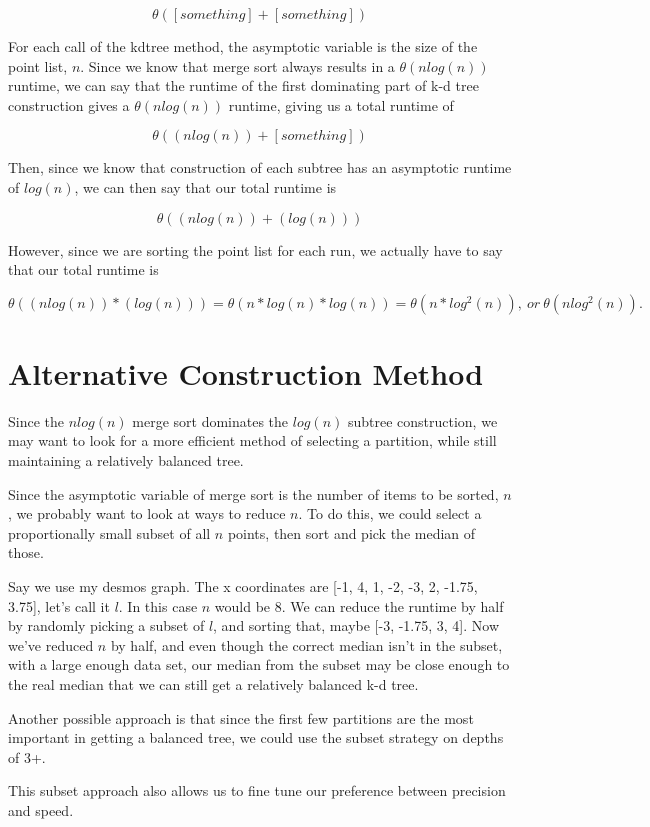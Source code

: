 \documentclass{article}
\begin{document}
$$\theta([something] + [something])$$

For each call of the kdtree method, the asymptotic variable is the size of the point list, $n$.
Since we know that merge sort always results in a $\theta(n log(n))$ runtime, we can say that the runtime of the first dominating
part of k-d tree construction gives a $\theta(n log(n))$ runtime, giving us a total runtime of

$$\theta((n log(n)) + [something])$$

Then, since we know that construction of each subtree has an asymptotic runtime of $log(n)$, we can then say that our total runtime is

$$\theta((n log(n)) + (log(n)))$$

However, since we are sorting the point list for each run, we actually have to say that our total runtime is

$$\theta((n log(n)) * (log(n))) = \theta(n * log(n) * log(n)) = \theta(n*log^{2}(n)),\ or\ \theta(n log^{2}(n)).$$

\section{Alternative Construction Method}
Since the $n log(n)$ merge sort dominates the $log(n)$ subtree construction, we may want to look for a more
efficient method of selecting a partition, while still maintaining a relatively balanced tree.

Since the asymptotic variable of merge sort is the number of items to be sorted, $n$, we probably want to look at
ways to reduce $n$. To do this, we could select a proportionally small subset of all $n$ points, then sort and pick the median of those.

Say we use my desmos graph. The x coordinates are [-1, 4, 1, -2, -3, 2, -1.75, 3.75], let's call it $l$.
In this case $n$ would be 8. We can reduce the runtime by half by randomly picking a subset of $l$, and sorting that, maybe [-3, -1.75, 3, 4].
Now we've reduced $n$ by half, and even though the correct median isn't in the subset, with a large enough data set, our
median from the subset may be close enough to the real median that we can still get a relatively balanced k-d tree.

Another possible approach is that since the first few partitions are the most important in getting a balanced tree, we could use
the subset strategy on depths of 3+.

This subset approach also allows us to fine tune our preference between precision and speed.
\end{document}
